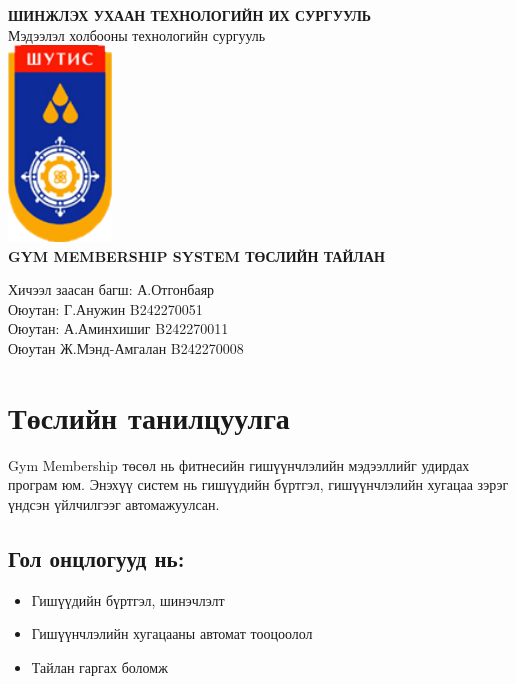 \documentclass[a4paper, 11pt]{article}
\begin{document}
\begin{center}
    {\large \textbf{ШИНЖЛЭХ УХААН ТЕХНОЛОГИЙН ИХ СУРГУУЛЬ}}\\[0.3cm]
    {\large Мэдээлэл холбооны технологийн сургууль}\\[1.2em]
\vspace{1cm}
    \includegraphics[width=1.08in, height=2.05in]{MustLogo.png}\\[1.2em]
\vspace{2cm}
    {\Huge \textbf{GYM MEMBERSHIP SYSTEM ТӨСЛИЙН ТАЙЛАН}}
\end{center}

\vspace{3cm}
\begin{flushleft}
\vspace*{\fill} 
\hspace*{0pt}Хичээл заасан багш: А.Отгонбаяр \\
\hspace*{0pt}Оюутан: Г.Анужин B242270051 \\
\hspace*{0pt}Оюутан: А.Аминхишиг B242270011 \\
\hspace*{0pt}Оюутан Ж.Мэнд-Амгалан B242270008\\
\end{flushleft}
\vspace{2cm}
\item 

\section*{Төслийн танилцуулга}
Gym Membership төсөл нь фитнесийн гишүүнчлэлийн мэдээллийг удирдах програм юм. Энэхүү систем нь гишүүдийн бүртгэл, гишүүнчлэлийн хугацаа зэрэг үндсэн үйлчилгээг автомажуулсан.
\subsection*{Гол онцлогууд нь:}
\begin{itemize}
\item Гишүүдийн бүртгэл, шинэчлэлт
\item Гишүүнчлэлийн хугацааны автомат тооцоолол 
\item Тайлан гаргах боломж
\end{itemize} 
\end{document}
